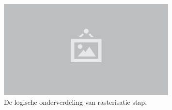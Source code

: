 \begin{figure}
  \centering
  \includegraphics[width=0.8\textwidth]{./img/raw/placeholder.png}
  \caption{De logische onderverdeling van rasterisatie stap.}
  \label{fig:mgp-rasterisatie}
\end{figure}
